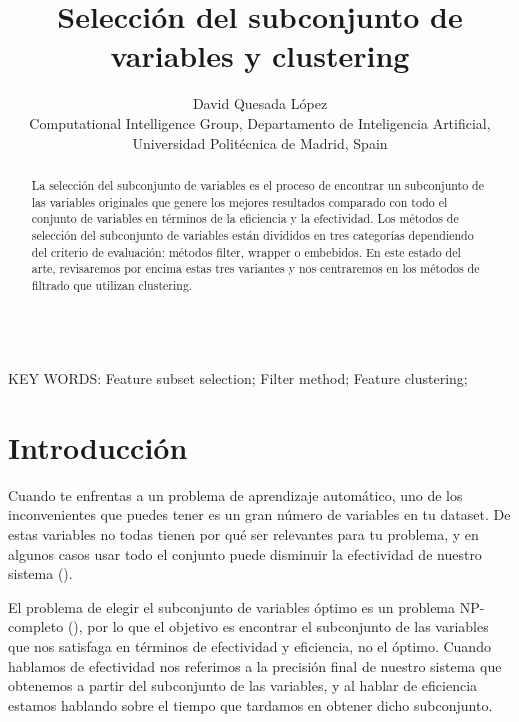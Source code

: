 \documentclass[a4paper,11pt]{article}
\begin{document}
\title{Selección del subconjunto de variables y clustering}

\author{{David Quesada López}\\
{\small Computational Intelligence Group, Departamento de Inteligencia Artificial, Universidad Polit\'ecnica de Madrid, Spain}}

\date{}
\maketitle



\begin{abstract} La selección del subconjunto de variables es el proceso de encontrar un subconjunto de las variables originales que genere los mejores resultados comparado con todo el conjunto de variables en términos de la eficiencia y la efectividad. Los métodos de selección del subconjunto de variables están divididos en tres categorías dependiendo del criterio de evaluación: métodos filter, wrapper o embebidos. En este estado del arte, revisaremos por encima estas tres variantes y nos centraremos en los métodos de filtrado que utilizan clustering.
\end{abstract}


\ \\
KEY WORDS: Feature subset selection; Filter method; Feature clustering;




\section{Introducción}

Cuando te enfrentas a un problema de aprendizaje automático, uno de los inconvenientes que puedes tener es un gran número de variables en tu dataset. De estas variables no todas tienen por qué ser relevantes para tu problema, y en algunos casos usar todo el conjunto puede disminuir la efectividad de nuestro sistema (\cite{hliu2011}).

El problema de elegir el subconjunto de variables óptimo es un problema NP-completo (\cite{albrecht1982}), por lo que el objetivo es encontrar el subconjunto de las variables que nos satisfaga en términos de efectividad y eficiencia, no el óptimo. Cuando hablamos de efectividad nos referimos a la precisión final de nuestro sistema que obtenemos a partir del subconjunto de las variables, y al hablar de eficiencia estamos hablando sobre el tiempo que tardamos en obtener dicho subconjunto.
\end{document}

